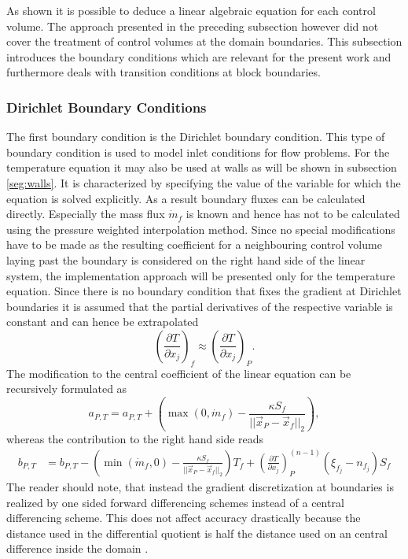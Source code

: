   As shown it is possible to deduce a linear algebraic equation for each control volume. The approach presented in the preceding subsection however did not cover the treatment of control volumes at the domain boundaries. This subsection introduces the boundary conditions which are relevant for the present work and furthermore deals with transition conditions at block boundaries.

  \subsubsection{Dirichlet Boundary Conditions}

  The first boundary condition is the Dirichlet boundary condition. This type of boundary condition is used to model inlet conditions for flow problems. For the temperature equation it may also be used at walls as will be shown in subsection \ref{seg:walls}. It is characterized by specifying the value of the variable for which the equation is solved explicitly. As a result boundary fluxes can be calculated directly. Especially the mass flux \(\dot{m}_f\) is known and hence has not to be calculated using the pressure weighted interpolation method. Since no special modifications have to be made as the resulting coefficient for a neighbouring control volume laying past the boundary is considered on the right hand side of the linear system, the implementation approach will be presented only for the temperature equation. Since there is no boundary condition that fixes the gradient at Dirichlet boundaries it is assumed that the partial derivatives of the respective variable is constant and can hence be extrapolated
  \begin{displaymath}
    \left( \frac{\partial T}{\partial x_j} \right)_f \approx \left( \frac{\partial T}{\partial x_j} \right)_P.
  \end{displaymath}
  The modification to the central coefficient of the linear equation can be recursively formulated as
  \begin{displaymath}
    a_{P,T} = a_{P,T} + \left( \max(0,\dot{m}_f )  - \frac{\kappa S_f}{|| \vec{x}_P - \vec{x}_f ||_2} \right),
  \end{displaymath}
  whereas the contribution to the right hand side reads
  \begin{align}
    b_{P,T} &= b_{P,T} - \left( \min(\dot{m}_f,0) - \frac{\kappa S_f}{||\vec{x}_P - \vec{x}_f||_2}\right) T_f +
    \left( \frac{\partial T}{\partial x_j}\right)_P^{(n-1)} \left(\xi_{f_j} - n_{f_j}\right)S_f \nonumber 
  \end{align}
  The reader should note, that instead the gradient discretization at boundaries is realized by one sided forward differencing schemes instead of a central differencing scheme. This does not affect accuracy drastically because the distance used in the differential quotient is half the distance used on an central difference inside the domain \cite{schaefer99}.

